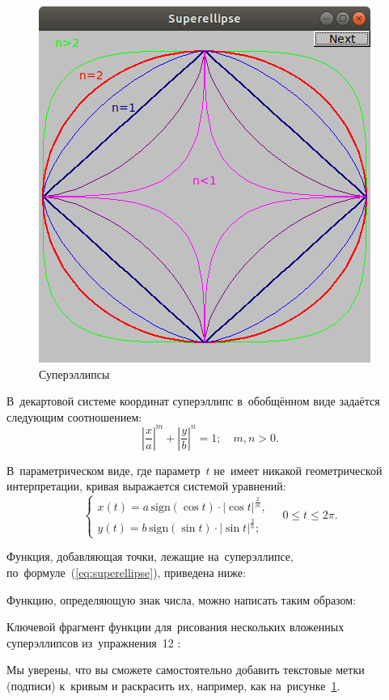 \begin{figure}[ht]
  {\centering
    \includegraphics[height=0.3\textwidth]{images/superellipse.png}

  }
  \caption{Суперэллипсы}
  \label{fig:superellipse}
\end{figure}

В~декартовой системе координат суперэллипс в~обобщённом виде задаётся следующим соотношением:
\[
  \left| \frac{x}{a} \right|^m + \left| \frac{y}{b} \right|^n = 1;\quad m, n > 0.
\]

В~параметрическом виде, где параметр~\(t\) не~имеет никакой геометрической интерпретации, кривая выражается системой уравнений:
\begin{equation}
  \label{eq:superellipse}
  \left\{\begin{array}{l}
    x(t) = a\,\mathrm{sign}(\cos t) \cdot |\cos t|^{\frac{2}{m}},\\
    y(t) = b\,\mathrm{sign}(\sin t) \cdot |\sin t|^{\frac{2}{n}};
  \end{array}\right.
  \quad 0 \leqslant t \leqslant 2\pi.
\end{equation}

Функция, добавляющая точки, лежащие на~суперэллипсе, по~формуле~(\ref{eq:superellipse}), приведена ниже:


Функцию, определяющую знак числа, можно написать таким образом:


Ключевой фрагмент функции  для~рисования нескольких вложенных суперэллипсов из~упражнения~12 :


Мы уверены, что вы сможете самостоятельно добавить текстовые метки (подписи) к~кривым и раскрасить их, например, как на~рисунке~\ref{fig:superellipse}.
